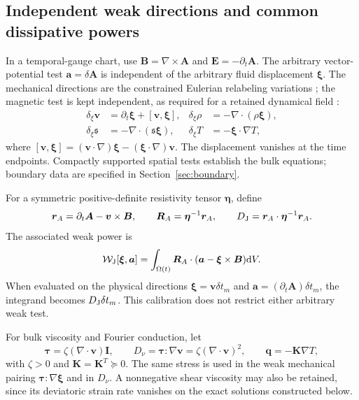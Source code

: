 \documentclass[11pt,a4paper]{article}
\theoremstyle{remark}\newtheorem{remark}{Remark}
\numberwithin{equation}{section}
\newcommand{\dd}{\mathrm{d}}
\newcommand{\vv}{\boldsymbol v}
\newcommand{\BB}{\boldsymbol B}
\newcommand{\Avec}{\boldsymbol A}
\newcommand{\EE}{\boldsymbol E}
\newcommand{\xii}{\boldsymbol\xi}
\newcommand{\atest}{\boldsymbol a}
\newcommand{\ttau}{\boldsymbol\tau}
\newcommand{\etab}{\boldsymbol\eta}
\newcommand{\Id}{\boldsymbol I}
\newcommand{\qv}{\boldsymbol q}
\newcommand{\grad}{\nabla}
\newcommand{\diver}{\nabla\!\cdot}
\newcommand{\curl}{\nabla\!\times}
\newcommand{\st}{\mathfrak s}
\begin{document}
\subsection{Independent weak directions and common dissipative powers}
In a temporal-gauge chart, use $\BB=\curl\Avec$ and $\EE=-\partial_t\Avec$. The arbitrary vector-potential test $\atest=\delta\Avec$ is independent of the arbitrary fluid displacement $\xii$. The mechanical directions are the constrained Eulerian relabeling variations \citep{Holm1998,RenEulerian}; the magnetic test is kept independent, as required for a retained dynamical field \citep{Carlier,Gawlik2025}:
\begin{equation}
\begin{aligned}
\delta_\xi\vv&=\partial_t\xii+[\vv,\xii],&
\delta_\xi\rho&=-\diver(\rho\xii),\\
\delta_\xi\st&=-\diver(\st\xii),&
\delta_\xi T&=-\xii\cdot\grad T,
\end{aligned}
\label{eq:variations}
\end{equation}
where $[\vv,\xii]=(\vv\cdot\grad)\xii-(\xii\cdot\grad)\vv$. The displacement vanishes at the time endpoints. Compactly supported spatial tests establish the bulk equations; boundary data are specified in Section~\ref{sec:boundary}.

For a symmetric positive-definite resistivity tensor $\etab$, define
\begin{equation}
\boldsymbol r_A=\partial_t\Avec-\vv\times\BB,\qquad
\boldsymbol R_A=\etab^{-1}\boldsymbol r_A,\qquad
D_{\rm J}=\boldsymbol r_A\cdot\etab^{-1}\boldsymbol r_A.
\label{eq:relative}
\end{equation}
The associated weak power is
\begin{equation}
\mathcal W_{\rm J}[\xii,\atest]
=\int_{\Omega(t)}\boldsymbol R_A\cdot(\atest-\xii\times\BB)\dd V.
\label{eq:weakohm}
\end{equation}
When evaluated on the physical directions $\xii=\vv\delta t_m$ and $\atest=(\partial_t\Avec)\delta t_m$, the integrand becomes $D_{\rm J}\delta t_m$. This calibration does not restrict either arbitrary weak test.

For bulk viscosity and Fourier conduction, let
\begin{equation}
\ttau=\zeta(\diver\vv)\Id,\qquad
D_\nu=\ttau:\grad\vv=\zeta(\diver\vv)^2,\qquad
\qv=-\boldsymbol K\grad T,
\label{eq:viscousheat}
\end{equation}
with $\zeta>0$ and $\boldsymbol K=\boldsymbol K^T\succeq0$. The same stress is used in the weak mechanical pairing $\ttau:\grad\xii$ and in $D_\nu$. A nonnegative shear viscosity may also be retained, since its deviatoric strain rate vanishes on the exact solutions constructed below.
\end{document}
